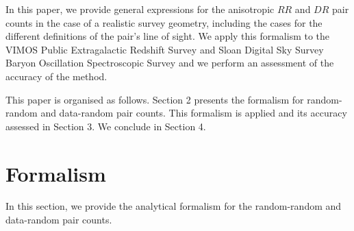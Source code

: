 \documentclass{aa}
\begin{document}
In this paper, we provide general expressions for the anisotropic $RR$ and $DR$ pair counts in the case of a realistic survey geometry, including the cases for the different definitions of the pair's line of sight. We apply this formalism to the VIMOS Public Extragalactic Redshift Survey \citep[VIPERS,][]{guzzo14vimos,garilli14} and Sloan Digital Sky Survey Baryon Oscillation Spectroscopic Survey \citep[SDSS-BOSS,][]{eisenstein11,dawson13baryon} and we perform an assessment of the accuracy of the method.

This paper is organised as follows. Section 2 presents the formalism for random-random and data-random pair counts. This formalism is applied and its accuracy assessed in Section 3. We conclude in Section 4.    

\section{Formalism}

In this section, we provide the analytical formalism for the random-random and data-random pair counts.
\end{document}
